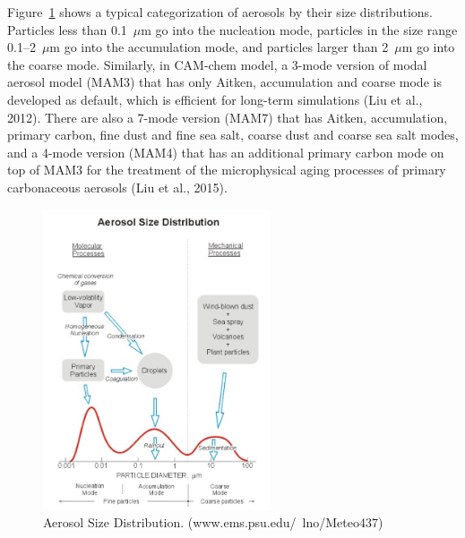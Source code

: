 \documentclass[12pt]{article}
\begin{document}
	Figure~\ref{fig_P4} shows a typical categorization of aerosols by their size distributions. Particles less than 0.1~$\mu$m go into the nucleation mode, particles in the size range 0.1--2~$\mu$m go into the accumulation mode, and particles larger than 2~$\mu$m go into the coarse mode. Similarly, in CAM-chem model, a 3-mode version of modal aerosol model (MAM3) that has only Aitken, accumulation and coarse mode is developed as default, which is efficient for long-term simulations (Liu et al., 2012). There are also a 7-mode version (MAM7) that has Aitken, accumulation, primary carbon, fine dust and fine sea salt, coarse dust and coarse sea salt modes, and a 4-mode version (MAM4) that has an additional primary carbon mode on top of MAM3 for the treatment of the microphysical aging processes of primary carbonaceous aerosols (Liu et al., 2015). 
	\begin{figure}[!h] 
		\begin{center}
			\includegraphics[width = 0.6\textwidth]{Figure04}
			\caption[]{\label{fig_P4} Aerosol Size Distribution. (www.ems.psu.edu/~lno/Meteo437)}
		\end{center}
	\end{figure}
		
\end{document}

